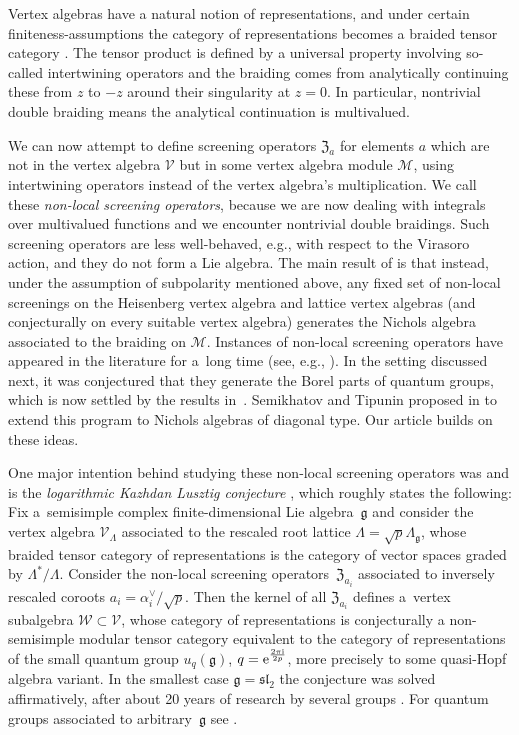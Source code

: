 \documentclass[pdftex]{sigma}%
\numberwithin{equation}{section}
\newcommand{\g}{\mathfrak{g}}
\newcommand{\zem}{\mathfrak{Z}}
\begin{document}
Vertex algebras have a natural notion of representations, and under certain fi\-ni\-te\-ness-as\-sump\-tions the category of representations becomes a braided tensor category \cite{HLZ06}. The tensor product is defined by a universal property involving so-called intertwining operators and the braiding comes from analytically continuing these from $z$ to $-z$ around their singularity at $z=0$. In particular, nontrivial double braiding means the analytical continuation is multivalued.

We can now attempt to define screening operators $\zem_a$ for elements $a$ which are not in the vertex algebra $\mathcal{V}$ but in some vertex algebra module $\mathcal{M}$, using intertwining operators instead of the vertex algebra's multiplication. We call these \emph{non-local screening operators}, because we are now dealing with integrals over multivalued functions and we encounter nontrivial double braidings. Such screening operators are less well-behaved, e.g., with respect to the Virasoro action, and they do not form a Lie algebra. The main result of \cite{Len17} is that instead, under the assumption of subpolarity mentioned above, any fixed set of non-local screenings on the Heisenberg vertex algebra and lattice vertex algebras (and conjecturally on every suitable vertex algebra) generates the Nichols algebra associated to the braiding on $\mathcal{M}$. Instances of non-local screening operators have appeared in the literature for a~long time (see, e.g., \cite{FF84,Fel89}). In the setting discussed next, it was conjectured that they generate the Borel parts of quantum groups, which is now settled by the results in~\cite{Len17}. Semikhatov and Tipunin proposed in \cite{Sem14, ST13} to extend this program to Nichols algebras of diagonal type. Our article builds on these ideas.

One major intention behind studying these non-local screening operators was and is the \emph{logarithmic Kazhdan Lusztig conjecture} \cite{AM08,FT10,FGST06a}, which roughly states the following: Fix a~semisimple complex finite-dimensional Lie algebra~$\g$ and consider the vertex algebra $\mathcal{V}_\Lambda$ associated to the rescaled root lattice $\Lambda=\sqrt{p}\Lambda_\g$, whose braided tensor category of representations is the category of vector spaces graded by $\Lambda^*/\Lambda$. Consider the non-local screening operators~$\zem_{a_i}$ associated to inversely rescaled coroots $a_i=\alpha_i^\vee/\sqrt{p}$. Then the kernel of all $\zem_{a_i}$ defines a~vertex subalgebra $\mathcal{W}\subset\mathcal{V}$, whose category of representations is conjecturally a non-semisimple modular tensor category equivalent to the category of representations of the small quantum group $u_q(\g)$, $q={\rm e}^{\frac{2\pi {\rm i}}{2p}}$, more precisely to some quasi-Hopf algebra variant. In the smallest case $\g=\mathfrak{sl}_2$ the conjecture was solved affirmatively, after about 20 years of research by several groups \cite{AM08,CLR21, CGR20,FGST06a, GN21, NT11, TW13}. For quantum groups associated to arbitrary~$\g$ see \cite{AM14,FT10,GLO18,Len17}.
\end{document}

